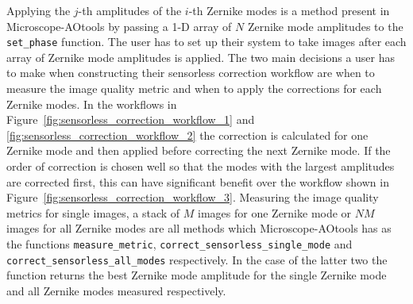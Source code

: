 Applying the $j$-th amplitudes of the $i$-th Zernike modes is a method present in Microscope-AOtools by passing a 1-D array of $N$ Zernike mode amplitudes to the \lstinline|set_phase| function. The user has to set up their system to take images after each array of Zernike mode amplitudes is applied. The two main decisions a user has to make when constructing their sensorless correction workflow are when to measure the image quality metric and when to apply the corrections for each Zernike modes. In the workflows in Figure~\ref{fig:sensorless_correction_workflow_1} and \ref{fig:sensorless_correction_workflow_2} the correction is calculated for one Zernike mode and then applied before correcting the next Zernike mode. If the order of correction is chosen well so that the modes with the largest amplitudes are corrected first, this can have significant benefit over the workflow shown in Figure~\ref{fig:sensorless_correction_workflow_3}. Measuring the image quality metrics for single images, a stack of $M$ images for one Zernike mode or $NM$ images for all Zernike modes are all methods which Microscope-AOtools has as the functions \lstinline|measure_metric|, \lstinline|correct_sensorless_single_mode| and \lstinline|correct_sensorless_all_modes| respectively. In the case of the latter two the function returns the best Zernike mode amplitude for the single Zernike mode and all Zernike modes measured respectively.

